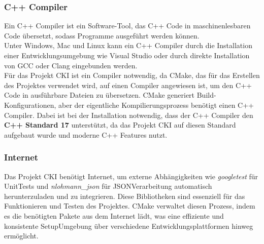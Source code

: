 \subsubsection{C++ Compiler}
\label{sec:BuildCCompiler}
Ein C++ Compiler ist ein Software-Tool, das C++ Code in maschinenlesbaren Code übersetzt, sodass Programme ausgeführt werden können. 
\\
Unter Windows, Mac und Linux kann ein C++ Compiler durch die Installation einer Entwicklungsumgebung wie Visual Studio oder durch direkte Installation von GCC oder Clang eingebunden werden. 
\\
Für das Projekt CKI ist ein Compiler notwendig, da CMake, das für das Erstellen des Projektes verwendet wird, auf einen Compiler angewiesen ist, um den C++ Code in ausführbare Dateien zu übersetzen. CMake generiert Build-Konfigurationen, aber der eigentliche Kompilierungsprozess benötigt einen C++ Compiler. Dabei ist bei der Installation notwendig, dass der C++ Compiler den \textbf{C++ Standard 17} unterstützt, da das Projekt CKI auf diesen Standard aufgebaut wurde und moderne C++ Features nutzt.

\subsubsection{Internet}
\label{sec:BuildInternet}
Das Projekt CKI benötigt Internet, um externe Abhängigkeiten wie \textit{googletest} für Unit\-Tests und \textit{nlohmann\_json} für JSON\-Verarbeitung automatisch herunterzuladen und zu integrieren. Diese Bibliotheken sind essenziell für das Funktionieren und Testen des Projektes. CMake verwaltet diesen Prozess, indem es die benötigten Pakete aus dem Internet lädt, was eine effiziente und konsistente Set\-up\-Umgebung über verschiedene Entwicklungsplattformen hinweg ermöglicht.

